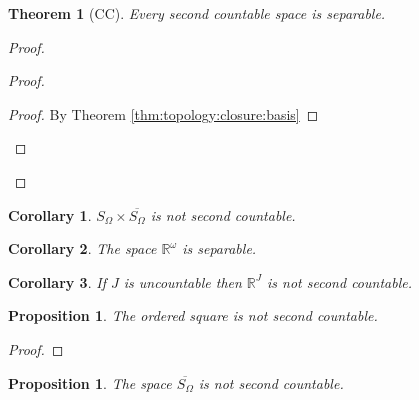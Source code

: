 \documentclass{report}
\let\qed\relax
\newtheorem{prop}[lm]{Proposition}
\newtheorem{thm}[lm]{Theorem}
\newtheorem{cor}{Corollary}[lm]
\theoremstyle{definition}
\begin{document}
    \begin{thm}[CC]
   Every second countable space is separable.
  \end{thm}

  \begin{proof}
   \pf
   \begin{proof}
     \qedstep
     \begin{proof}
       \pf By Theorem \ref{thm:topology:closure:basis}
     \end{proof}
   \end{proof}
  \end{proof}

  \begin{cor}
    $S_\Omega \times \overline{S_\Omega}$ is not second countable.
  \end{cor}

  \begin{cor}
    The space $\mathbb{R}^\omega$ is separable.
  \end{cor}

\begin{cor}
	If $J$ is uncountable then $\mathbb{R}^J$ is not second countable.
\end{cor}

    \begin{prop}
   The ordered square is not second countable.
  \end{prop}

  \begin{proof}
   \pf
   \qed
  \end{proof}

  \begin{prop}
    The space $\overline{S_\Omega}$ is not second countable.
  \end{prop}
\end{document}
